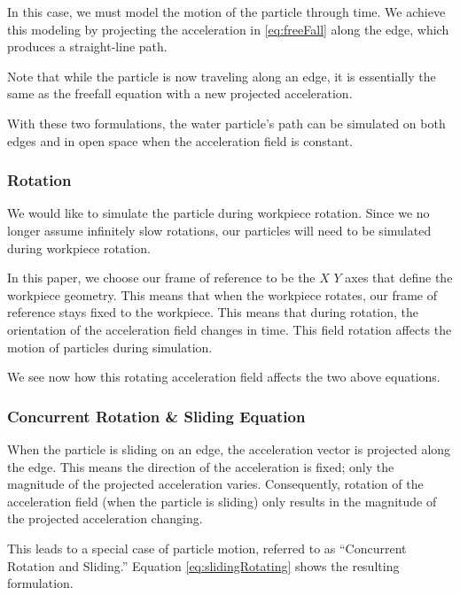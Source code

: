 In this case, we must model the motion of the particle through time. We achieve this modeling by projecting the acceleration in \eqref{eq:freeFall} along the edge, which produces a straight-line path.

Note that while the particle is now traveling along an edge, it is essentially the same as the freefall equation with a new projected acceleration.



With these two formulations, the water particle's path can be simulated on both edges and in open space when the acceleration field is constant.

		\subsubsection{Rotation}

We would like to simulate the particle during workpiece rotation. Since we no longer assume infinitely slow rotations, our particles will need to be simulated during workpiece rotation.

In this paper, we choose our frame of reference to be the $X$ $Y$ axes that define the workpiece geometry. This means that when the workpiece rotates, our frame of reference stays fixed to the workpiece. This means that during rotation, the orientation of the acceleration field changes in time. This field rotation affects the motion of particles during simulation.

We see now how this rotating acceleration field affects the two above equations.

		\subsubsection{Concurrent Rotation \& Sliding Equation}

When the particle is sliding on an edge, the acceleration vector is projected along the edge. This means the direction of the acceleration is fixed; only the magnitude of the projected acceleration varies. Consequently, rotation of the acceleration field (when the particle is sliding) only results in the magnitude of the projected acceleration changing.

This leads to a special case of particle motion, referred to as ``Concurrent Rotation and Sliding.'' Equation \eqref{eq:slidingRotating} shows the resulting formulation.

